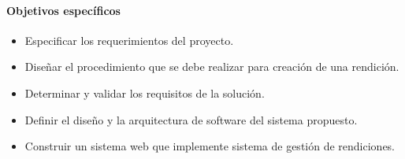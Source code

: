 \paragraph{Objetivos específicos} %


\begin{itemize}
	\item Especificar los requerimientos del proyecto.

	\item Diseñar el procedimiento que se debe realizar para creación de una rendición.

	\item Determinar y validar los requisitos de la solución.

	\item Definir el diseño y la arquitectura de software del sistema propuesto.

	\item Construir un sistema web que implemente sistema de gestión de rendiciones.

\end{itemize}


